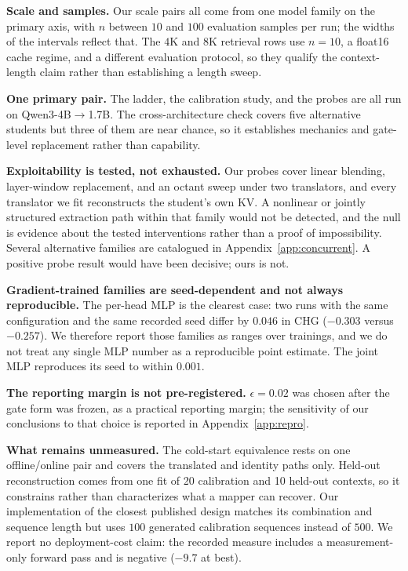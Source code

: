 \documentclass{article} %
\newcommand{\kv}{\ensuremath{\mathrm{KV}}}
\begin{document}
\textbf{Scale and samples.} Our scale pairs all come from one model family on
the primary axis, with $n$ between $10$ and $100$ evaluation samples per run;
the widths of the intervals reflect that. The $4$K and $8$K retrieval rows use
$n{=}10$, a float16 cache regime, and a different evaluation protocol, so they
qualify the context-length claim rather than establishing a length sweep.

\textbf{One primary pair.} The ladder, the calibration study, and the probes are
all run on Qwen3-4B$\to$1.7B. The cross-architecture check covers five
alternative students but three of them are near chance, so it establishes
mechanics and gate-level replacement rather than capability.

\textbf{Exploitability is tested, not exhausted.} Our probes cover linear
blending, layer-window replacement, and an octant sweep under two translators,
and every translator we fit reconstructs the student's own \kv{}. A nonlinear or
jointly structured extraction path within that family would not be detected, and
the null is evidence about the tested interventions rather than a proof of
impossibility. Several alternative families are catalogued in
Appendix~\ref{app:concurrent}. A positive probe result would have been decisive;
ours is not.

\textbf{Gradient-trained families are seed-dependent and not always
reproducible.} The per-head MLP is the clearest case: two runs with the same
configuration and the same recorded seed differ by $0.046$ in CHG
($-0.303$ versus $-0.257$). We therefore report those families as ranges over
trainings, and we do not treat any single MLP number as a reproducible point
estimate. The joint MLP reproduces its seed to within $0.001$.

\textbf{The reporting margin is not pre-registered.} $\epsilon{=}0.02$ was
chosen after the gate form was frozen, as a practical reporting margin; the
sensitivity of our conclusions to that choice is reported in
Appendix~\ref{app:repro}.

\textbf{What remains unmeasured.} The cold-start equivalence rests on one
offline/online pair and covers the translated and identity paths only. Held-out
reconstruction comes from one fit of 20 calibration and 10 held-out contexts, so
it constrains rather than characterizes what a mapper can recover. Our
implementation of the closest published design matches its combination and
sequence length but uses $100$ generated calibration sequences instead of $500$.
We report no deployment-cost claim: the recorded measure includes a
measurement-only forward pass and is negative ($-9.7$ at best).
\end{document}
